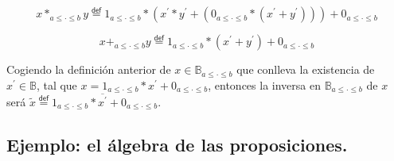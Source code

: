 \documentclass[final,12pt,a4paper,twoside,fleqn]{extbook}
\newcommand{\mathdef}{\ensuremath{\stackrel{\mathsf{def}}{{}={}}}}
\newcommand{\setB}{\ensuremath{\mathbb{B}}}
\theoremstyle{definition}
\theoremstyle{remark}
\begin{document}
\begin{equation}
  x {*}_{a \leq\cdot\leq b} y \mathdef 
  1_{a \leq\cdot\leq b} * 
  \left(
  x^\prime * y^\prime + 
  \left(
  0_{a \leq\cdot\leq b} * \left(x^\prime + y^\prime \right)
  \right)
  \right) + 0_{a \leq\cdot\leq b}
\end{equation}



\begin{equation}
  x {+}_{a \leq\cdot\leq b} y \mathdef 
  1_{a \leq\cdot\leq b} * 
  \left(
  x^\prime + y^\prime 
  \right) 
  + 
  0_{a \leq\cdot\leq b}
\end{equation}



Cogiendo la definición anterior de \(x \in \setB_{a\leq\cdot\leq b}\) que
conlleva la existencia de \(x^\prime \in \setB\), tal que \(x =
1_{a\leq\cdot\leq b} * x^\prime + 0_{a\leq\cdot\leq b}\), entonces la
inversa en \(\setB_{a\leq\cdot\leq b}\) de \(x\) será \(\tilde x \mathdef
1_{a\leq\cdot\leq b} * \overline{x^\prime} + 0_{a\leq\cdot\leq b}\).



\subsection{Ejemplo: el álgebra de las proposiciones.} 
\end{document}
